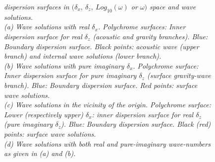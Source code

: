 \documentclass[a4paper,11pt]{article}
\begin{document}
\begin{figure}[!h]
	\caption{\textit{dispersion surfaces in $(\delta_x,\ \delta_z,\ Log_{10}(\omega)$ or $\omega)$  space and wave solutions.\\
	 (a) Wave solutions with real $\delta_x$. Polychrome surfaces: Inner dispersion surface for real $\delta_z$ (acoustic and gravity branches). Blue: Boundary dispersion surface. Black points: acoustic wave (upper branch) and internal wave solutions (lower branch).\\
	 (b) Wave solutions with pure imaginary $\delta_x$. Polychrome surface: Inner dispersion surface for pure imaginary $\delta_z$ (surface gravity-wave branch). Blue: Boundary dispersion surface. Red points: surface wave solutions.\\ 
	 (c) Wave solutions in the vicinity of the origin. Polychrome surface: Lower (respectively upper) $\delta_x$: inner dispersion surface for real $\delta_z$ (pure imaginary $\delta_z$). Blue: Boundary dispersion surface. Black (red) points: surface wave solutions.\\
	 (d) Wave solutions with both real and pure-imaginary wave-numbers as given in (a) and (b). } }
	\label{FigDispSolutions}
\end{figure}
\end{document}
